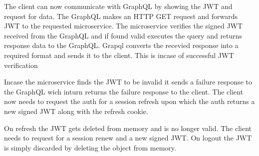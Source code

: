 The client can now communicate with GraphQL by showing the JWT and request for data.
The GraphQL makes an HTTP GET request and forwards JWT to the requested microservice.
The microservice verifies the signed JWT received from the GraphQL and if found valid 
executes the query and returns response data to the GraphQL.
Grapql converts the recevied response into a required format and sends it to the client.
This is incase of successful JWT verification

Incase the microservice finds the JWT to be invalid it sends a failure response to the 
GraphQL wich inturn returns the failure response to the client.
The client now needs to request the auth for a session refresh upon which the auth 
returns a new signed JWT along with the refresh cookie.

On refresh the JWT gets deleted from memory and is no longer valid. The client needs 
to request for a session renew and a new signed JWT.
On logout the JWT is simply discarded by deleting the object from memory. 

